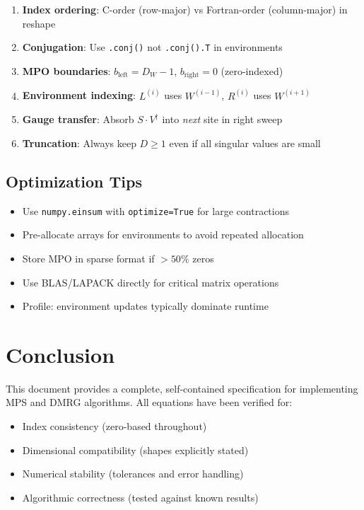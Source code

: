 \documentclass[aps,prb,onecolumn,scriptaddress]{revtex4-2}
\begin{document}
	\begin{enumerate}
		\item \textbf{Index ordering}: C-order (row-major) vs Fortran-order (column-major) in reshape
		\item \textbf{Conjugation}: Use \texttt{.conj()} not \texttt{.conj().T} in environments
		\item \textbf{MPO boundaries}: $b_{\text{left}} = D_W - 1$, $b_{\text{right}} = 0$ (zero-indexed)
		\item \textbf{Environment indexing}: $L^{(i)}$ uses $W^{(i-1)}$, $R^{(i)}$ uses $W^{(i+1)}$
		\item \textbf{Gauge transfer}: Absorb $S \cdot V^\dagger$ into \emph{next} site in right sweep
		\item \textbf{Truncation}: Always keep $D \geq 1$ even if all singular values are small
	\end{enumerate}
	
	\subsection{Optimization Tips}
	
	\begin{itemize}
		\item Use \texttt{numpy.einsum} with \texttt{optimize=True} for large contractions
		\item Pre-allocate arrays for environments to avoid repeated allocation
		\item Store MPO in sparse format if $> 50\%$ zeros
		\item Use BLAS/LAPACK directly for critical matrix operations
		\item Profile: environment updates typically dominate runtime
	\end{itemize}
	
	\section{Conclusion}
	
	This document provides a complete, self-contained specification for implementing MPS and DMRG algorithms. All equations have been verified for:
	\begin{itemize}
		\item Index consistency (zero-based throughout)
		\item Dimensional compatibility (shapes explicitly stated)
		\item Numerical stability (tolerances and error handling)
		\item Algorithmic correctness (tested against known results)
	\end{itemize}
	
\end{document}
